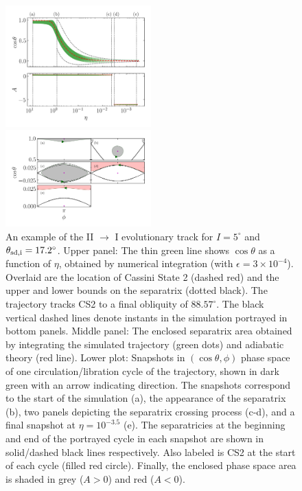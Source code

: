 \documentclass[
        fleqn,
        usenatbib,
    ]{mnras}
\newcommand*{\p}[1]{\left(#1\right)}
\begin{document}
\begin{figure}
    \centering
    \includegraphics[width=0.5\textwidth]{plots_diskdisp/3testo21.png}

    \includegraphics[width=0.5\textwidth]{plots_diskdisp/3testo21_subplots.png}
    \caption{An example of the II $\to$ I evolutionary track for $I = 5^\circ$
    and $\theta_{\rm sd, i} = 17.2^\circ$. Upper panel: The thin green line shows
    $\cos \theta$ as a function of $\eta$, obtained by numerical integration
    (with $\epsilon = 3 \times 10^{-4}$). Overlaid are the location of Cassini
    State 2 (dashed red) and the upper and lower bounds on the separatrix
    (dotted black). The trajectory tracks CS2 to a final obliquity of
    $88.57^\circ$. The black vertical dashed lines denote instants in the
    simulation  portrayed in bottom panels. Middle panel: The enclosed
    separatrix area obtained by integrating the simulated trajectory (green
    dots) and adiabatic theory (red line). Lower plot: Snapshots in $\p{\cos
    \theta, \phi}$ phase space of one circulation/libration cycle of the
    trajectory, shown in dark green with an arrow indicating direction. The
    snapshots correspond to the start of the simulation (a), the appearance of
    the separatrix (b), two panels depicting the separatrix crossing process
    (c-d), and a final snapshot at $\eta = 10^{-3.5}$ (e). The separatricies at
    the beginning and end of the portrayed cycle in each snapshot are shown in
    solid/dashed black lines respectively. Also labeled is CS2 at the start of
    each cycle (filled red circle). Finally, the enclosed phase space area is
    shaded in grey ($A > 0$) and red ($A < 0$).}\label{fig:ad_21}
\end{figure}
\end{document}
